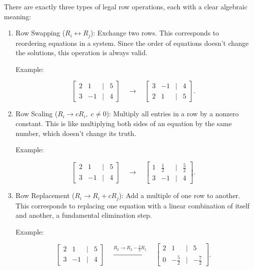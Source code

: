 \documentclass[
  letterpaper,
  DIV=11,
  numbers=noendperiod]{scrreprt}
\begin{document}
There are exactly three types of legal row operations, each with a clear
algebraic meaning:

\begin{enumerate}
\def\labelenumi{\arabic{enumi}.}
\item
  Row Swapping (\(R_i \leftrightarrow R_j\)): Exchange two rows. This
  corresponds to reordering equations in a system. Since the order of
  equations doesn't change the solutions, this operation is always
  valid.

  Example:

  \[
  \begin{bmatrix}  
  2 & 1 & | & 5 \\  
  3 & -1 & | & 4  
  \end{bmatrix}  
  \quad \longrightarrow \quad  
  \begin{bmatrix}  
  3 & -1 & | & 4 \\  
  2 & 1 & | & 5  
  \end{bmatrix}.
  \]
\item
  Row Scaling (\(R_i \to cR_i, \; c \neq 0\)): Multiply all entries in a
  row by a nonzero constant. This is like multiplying both sides of an
  equation by the same number, which doesn't change its truth.

  Example:

  \[
  \begin{bmatrix}  
  2 & 1 & | & 5 \\  
  3 & -1 & | & 4  
  \end{bmatrix}  
  \quad \longrightarrow \quad  
  \begin{bmatrix}  
  1 & \tfrac{1}{2} & | & \tfrac{5}{2} \\  
  3 & -1 & | & 4  
  \end{bmatrix}.
  \]
\item
  Row Replacement (\(R_i \to R_i + cR_j\)): Add a multiple of one row to
  another. This corresponds to replacing one equation with a linear
  combination of itself and another, a fundamental elimination step.

  Example:

  \[
  \begin{bmatrix}  
  2 & 1 & | & 5 \\  
  3 & -1 & | & 4  
  \end{bmatrix}  
  \quad \overset{R_2 \to R_2 - \tfrac{3}{2}R_1}{\longrightarrow} \quad  
  \begin{bmatrix}  
  2 & 1 & | & 5 \\  
  0 & -\tfrac{5}{2} & | & -\tfrac{7}{2}  
  \end{bmatrix}.
  \]
\end{enumerate}
\end{document}
